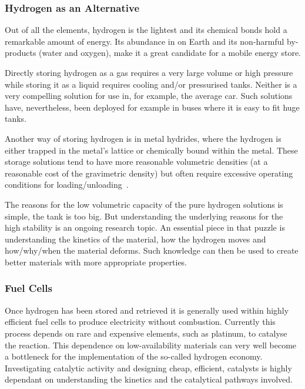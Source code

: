 \subsubsection{Hydrogen as an Alternative}
Out of all the elements, hydrogen is the lightest and its chemical bonds hold a remarkable amount of energy.
Its abundance in on Earth and its non-harmful by-products (water and oxygen), make it a great candidate for a mobile energy store.

Directly storing hydrogen as a gas requires a very large volume or high pressure while storing it as a liquid requires cooling and/or pressurised tanks.
Neither is a very compelling solution for use in, for example, the average car.
Such solutions have, nevertheless, been deployed for example in buses where it is easy to fit huge tanks. %

Another way of storing hydrogen is in metal hydrides, where the hydrogen is either trapped in the metal's lattice or chemically bound within the metal.
These storage solutions tend to have more reasonable volumetric densities (at a reasonable cost of the gravimetric density) but often require excessive operating conditions for loading/unloading~\cite{borohydride-stability-2006}.

The reasons for the low volumetric capacity of the pure hydrogen solutions is simple, the tank is too big.
But understanding the underlying reasons for the high stability is an ongoing research topic.
An essential piece in that puzzle is understanding the kinetics of the material, how the hydrogen moves and how/why/when the material deforms.
Such knowledge can then be used to create better materials with more appropriate properties.

\subsubsection{Fuel Cells}
Once hydrogen has been stored and retrieved it is generally used within highly efficient fuel cells to produce electricity without combustion. %
Currently this process depends on rare and expensive elements, such as platinum, to catalyse the reaction.
This dependence on low-availability materials can very well become a bottleneck for the implementation of the so-called hydrogen economy.
Investigating catalytic activity and designing cheap, efficient, catalysts is highly dependant on understanding the kinetics and the catalytical pathways involved.

